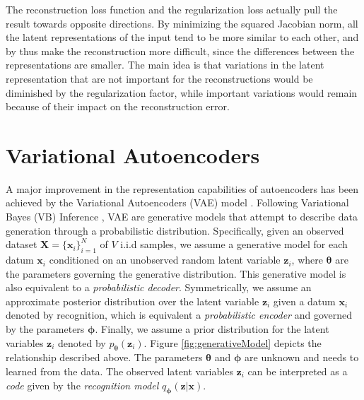 \documentclass[graybox]{svmult}
\newcommand{\mb}[1]{\mathbf{#1}}
\newcommand{\bx}[0]{\mb{x}}
\newcommand{\bz}[0]{\mb{z}}
\newcommand{\btheta}[0]{\mb{\theta}}
\newcommand{\bphi}[0]{\mb{\phi}}
\begin{document}
The reconstruction loss function and the regularization loss actually pull the result towards opposite directions. By minimizing the squared Jacobian norm, all the latent representations of the input tend to be more similar to each other, and by thus make the reconstruction more difficult, since the differences between the representations are smaller. The main idea is that variations in the latent representation that are not important for the reconstructions would be diminished by the regularization factor, while important variations would remain because of their impact on the reconstruction error.

\section{Variational Autoencoders}
\label{sec:variational_autoencoders}
A major improvement in the representation capabilities of autoencoders has been achieved by the Variational Autoencoders (VAE) model \cite{VariationalAutoEncoder}. 
Following Variational Bayes (VB) Inference \cite{BishopBook}, VAE are generative models that attempt to describe data generation through a probabilistic distribution. 
Specifically, given an observed dataset $\mb{X}=\{\bx_i\}_{i=1}^N$ of $V$ i.i.d samples, 
we assume a generative model for each datum $\bx_i$ conditioned on an unobserved random latent variable $\bz_i$, where $\btheta$ are the parameters governing the generative distribution. This generative model is also equivalent to a \emph{probabilistic decoder}. Symmetrically, we assume an approximate posterior distribution over the latent variable $\bz_i$ given a datum $\bx_i$ denoted by recognition,  which is equivalent a \emph{probabilistic encoder} and governed by the parameters $\bphi$. Finally, we assume a prior distribution for the latent variables $\bz_i$ denoted by $p_\btheta \left( \bz_i \right)$. 
Figure \ref{fig:generativeModel} depicts the relationship described above. The parameters $\btheta$ and $\bphi$ are unknown and needs to learned from the data. The observed latent variables $\bz_i$ can be interpreted as a \emph{code} given by the \emph{recognition model}  $q_{\bphi} \left( \bz | \bx \right)$.
\end{document}
